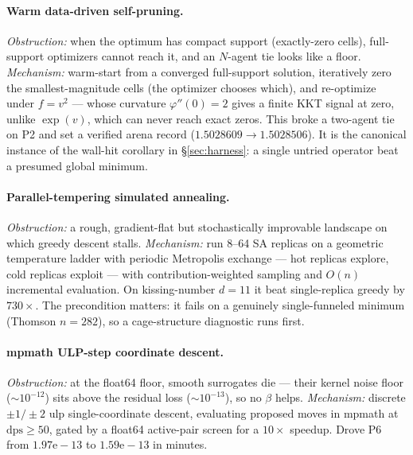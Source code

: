 \documentclass[11pt]{article}
\newcommand{\src}[1]{}
\begin{document}
\paragraph{Warm data-driven self-pruning.}
\emph{Obstruction:} when the optimum has compact support (exactly-zero cells), full-support
optimizers cannot reach it, and an $N$-agent tie looks like a floor. \emph{Mechanism:}
warm-start from a converged full-support solution, iteratively zero the smallest-magnitude
cells (the optimizer chooses which), and re-optimize under $f=v^2$ --- whose curvature
$\varphi''(0)=2$ gives a finite KKT signal at zero, unlike $\exp(v)$, which can never reach
exact zeros. This broke a two-agent tie on P2 and set a verified arena record
($1.5028609\to 1.5028506$). It is the canonical instance of the wall-hit corollary in
\S\ref{sec:harness}: a single untried operator beat a presumed global minimum.
\src{techniques/warm-self-pruning-compact-support.md, findings/p2-warm-self-pruning-beats-record.md}

\paragraph{Parallel-tempering simulated annealing.}
\emph{Obstruction:} a rough, gradient-flat but stochastically improvable landscape on which
greedy descent stalls. \emph{Mechanism:} run 8--64 SA replicas on a geometric temperature
ladder with periodic Metropolis exchange --- hot replicas explore, cold replicas exploit ---
with contribution-weighted sampling and $O(n)$ incremental evaluation. On kissing-number
$d=11$ it beat single-replica greedy by $730\times$. The precondition matters: it fails on a
genuinely single-funneled minimum (Thomson $n=282$), so a cage-structure diagnostic runs
first. \src{techniques/parallel-tempering-sa.md}

\paragraph{mpmath ULP-step coordinate descent.}
\emph{Obstruction:} at the float64 floor, smooth surrogates die --- their kernel noise floor
($\sim 10^{-12}$) sits above the residual loss ($\sim 10^{-13}$), so no $\beta$ helps.
\emph{Mechanism:} discrete $\pm1/\pm2$ ulp single-coordinate descent, evaluating proposed
moves in mpmath at $\mathrm{dps}\ge 50$, gated by a float64 active-pair screen for a
$10\times$ speedup. Drove P6 from $1.97\mathrm{e}{-}13$ to $1.59\mathrm{e}{-}13$ in minutes.
\src{techniques/mpmath-ulp-polish.md}
\end{document}
